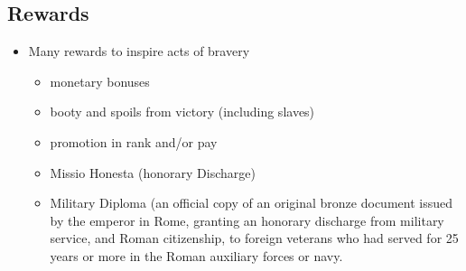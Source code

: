 \documentclass[12pt, twoside]{article}
\begin{document}
\subsection{Rewards}
\begin{itemize}	
\item Many rewards to inspire acts of bravery
	\begin{itemize}
	\item monetary bonuses
	\item booty and spoils from victory (including slaves)
	\item promotion in rank and/or pay
	\item Missio Honesta (honorary Discharge)
	\item Military Diploma (an official copy of an original bronze document issued by the emperor in Rome, granting an honorary discharge from military service, and Roman citizenship, to foreign veterans who had served for 25 years or more in the Roman auxiliary forces or navy.
	\end{itemize}
\end{itemize}
\end{document}
